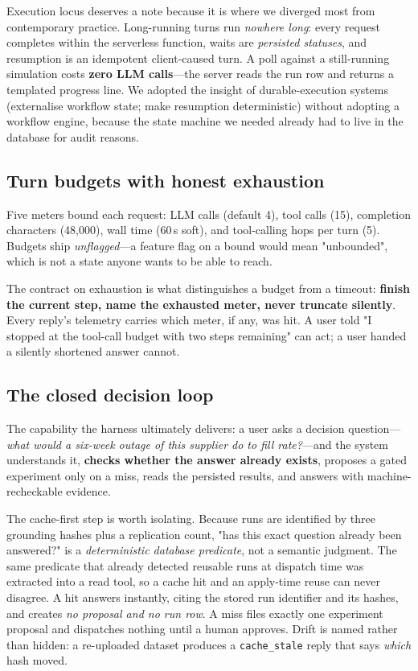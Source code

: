 \documentclass[conference]{IEEEtran}
\begin{document}
Execution locus deserves a note because it is where we diverged most from
contemporary practice. Long-running turns run \emph{nowhere long}: every request
completes within the serverless function, waits are \emph{persisted statuses},
and resumption is an idempotent client-caused turn. A poll against a still-running
simulation costs \textbf{zero LLM calls}---the server reads the run row and
returns a templated progress line. We adopted the insight of durable-execution
systems (externalise workflow state; make resumption deterministic) without
adopting a workflow engine, because the state machine we needed already had to
live in the database for audit reasons.

\subsection{Turn budgets with honest exhaustion}

Five meters bound each request: LLM calls (default 4), tool calls (15),
completion characters (48{,}000), wall time (60\,s soft), and tool-calling hops
per turn (5). Budgets ship \emph{unflagged}---a feature flag on a bound would mean
"unbounded", which is not a state anyone wants to be able to reach.

The contract on exhaustion is what distinguishes a budget from a timeout:
\textbf{finish the current step, name the exhausted meter, never truncate
silently}. Every reply's telemetry carries which meter, if any, was hit. A user
told "I stopped at the tool-call budget with two steps remaining" can act; a user
handed a silently shortened answer cannot.

\subsection{The closed decision loop}
\label{sec:loop}

The capability the harness ultimately delivers: a user asks a decision
question---\emph{what would a six-week outage of this supplier do to fill
rate?}---and the system understands it, \textbf{checks whether the answer already
exists}, proposes a gated experiment only on a miss, reads the persisted results,
and answers with machine-recheckable evidence.

The cache-first step is worth isolating. Because runs are identified by three
grounding hashes plus a replication count, "has this exact question already been
answered?" is a \emph{deterministic database predicate}, not a semantic judgment.
The same predicate that already detected reusable runs at dispatch time was
extracted into a read tool, so a cache hit and an apply-time reuse can never
disagree. A hit answers instantly, citing the stored run identifier and its
hashes, and creates \emph{no proposal and no run row}. A miss files exactly one
experiment proposal and dispatches nothing until a human approves. Drift is named
rather than hidden: a re-uploaded dataset produces a \texttt{cache\_stale} reply
that says \emph{which} hash moved.
\end{document}
